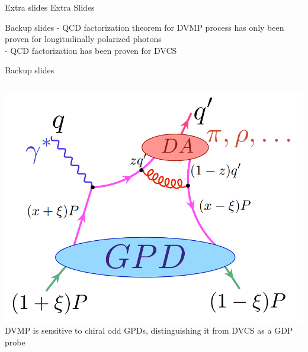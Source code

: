 \documentclass[aspectratio=169]{beamer}
\begin{document}
\appendix



\begin{frame}{Extra slides}
Extra Slides

\end{frame}




\begin{frame}{Backup slides}
      - QCD factorization theorem for DVMP process has only been proven for longitudinally polarized photons\\
    - QCD factorization has been proven for DVCS
 
\end{frame}


\begin{frame}{Backup slides}

   \begin{columns}
            \includegraphics[scale=0.2]{Pics/currentWork/dvpipdiagram.png}\\
            DVMP is sensitive to chiral odd GPDs, distinguishing it from DVCS as a GDP probe\\
            

\end{columns}
\end{frame}
\end{document}

